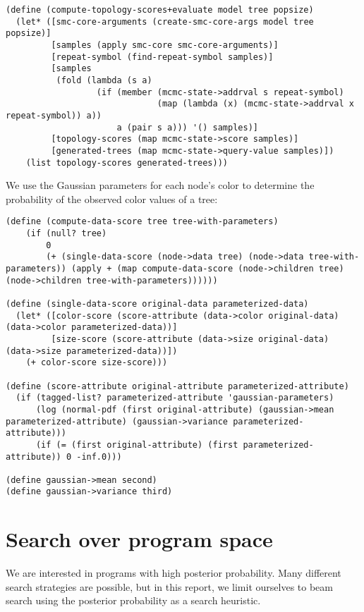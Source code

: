 \documentclass[a4paper,10pt]{article}
\begin{document}
\begin{lstlisting}[frame=trBL]
(define (compute-topology-scores+evaluate model tree popsize)
  (let* ([smc-core-arguments (create-smc-core-args model tree popsize)]
         [samples (apply smc-core smc-core-arguments)]
         [repeat-symbol (find-repeat-symbol samples)]
         [samples
          (fold (lambda (s a)
                  (if (member (mcmc-state->addrval s repeat-symbol)
                              (map (lambda (x) (mcmc-state->addrval x repeat-symbol)) a))
                      a (pair s a))) '() samples)]
         [topology-scores (map mcmc-state->score samples)]
         [generated-trees (map mcmc-state->query-value samples)])
    (list topology-scores generated-trees)))
\end{lstlisting}
We use the Gaussian parameters for each node's color to determine the probability of the observed color values of a tree:
\begin{lstlisting}[frame=trBL]
(define (compute-data-score tree tree-with-parameters)
    (if (null? tree)
        0
        (+ (single-data-score (node->data tree) (node->data tree-with-parameters)) (apply + (map compute-data-score (node->children tree) (node->children tree-with-parameters))))))

(define (single-data-score original-data parameterized-data)
  (let* ([color-score (score-attribute (data->color original-data) (data->color parameterized-data))]
         [size-score (score-attribute (data->size original-data) (data->size parameterized-data))])
    (+ color-score size-score)))

(define (score-attribute original-attribute parameterized-attribute)
  (if (tagged-list? parameterized-attribute 'gaussian-parameters)
      (log (normal-pdf (first original-attribute) (gaussian->mean parameterized-attribute) (gaussian->variance parameterized-attribute)))
      (if (= (first original-attribute) (first parameterized-attribute)) 0 -inf.0)))

(define gaussian->mean second)
(define gaussian->variance third)
\end{lstlisting}


\newpage
\section{Search over program space}

We are interested in programs with high posterior probability. Many different search strategies are possible, but in this report, we limit ourselves to beam search using the posterior probability as a search heuristic.
\end{document}

